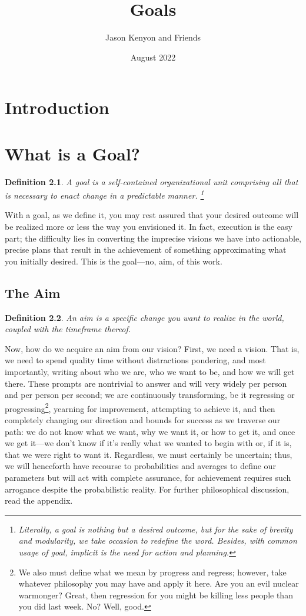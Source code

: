 \documentclass{book}
\title{Goals}
\author{Jason Kenyon and Friends}
\date{August 2022}
\newtheorem{defn}{Definition}[section]
\numberwithin{equation}{section}
\begin{document}
\maketitle
\tableofcontents

\chapter{Introduction}



\chapter{What is a Goal?}
\begin{defn}
A goal is a self-contained organizational unit comprising all that is necessary to enact change in a predictable manner. \footnote{Literally, a goal is nothing but a desired outcome, but for the sake of brevity and modularity, we take occasion to redefine the word. Besides, with common usage of \emph{goal}, implicit is the need for action and planning.} 
\end{defn}
With a goal, as we define it, you may rest assured that your desired outcome will be realized more or less the way you envisioned it. In fact, execution is the easy part; the difficulty lies in converting the imprecise visions we have into actionable, precise plans that result in the achievement of something approximating what you initially desired. This is the goal---no, aim, of this work.
\section{The Aim}
\begin{defn}
An aim is a specific change you want to realize in the world, coupled with the timeframe thereof.
\end{defn}
Now, how do we acquire an aim from our vision? First, we need a vision. That is, we need to spend quality time without distractions pondering, and most importantly, writing about who we are, who we want to be, and how we will get there. These prompts are nontrivial to answer and will very widely per person and per person per second; we are continuously transforming, be it regressing or progressing\footnote{We also must define what we mean by progress and regress; however, take whatever philosophy you may have and apply it here. Are you an evil nuclear warmonger? Great, then regression for you might be killing less people than you did last week. No? Well, good.}, yearning for improvement, attempting to achieve it, and then completely changing our direction and bounds for success as we traverse our path: we do not know what we want, why we want it, or how to get it, and once we get it---we don't know if it's really what we wanted to begin with or, if it is, that we were right to want it. Regardless, we must certainly be uncertain; thus, we will henceforth have recourse to probabilities and averages to define our parameters but will act with complete assurance, for achievement requires such arrogance despite the probabilistic reality. For further philosophical discussion, read the appendix.
\end{document}
